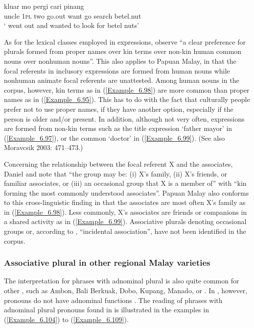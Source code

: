 \ea
\label{Example_6.103}
 {} {} {kluar} {mo} {pergi} {cari} {pinang}\\ %
 uncle  \textsc{1pl}  two  go.out  want  go  search  betel.nut\\

\glt
‘ went out and wanted to look for betel nuts’ \textstyleExampleSource{[081006-009-Cv.0014]}
\z



As for the lexical classes employed in  expressions, \citet[3]{Daniel.2013} observe “a clear preference for  plurals formed from proper names over kin terms over non-kin human common nouns over nonhuman nouns”. This also applies to Papuan Malay, in that the focal referents in  inclusory expressions are formed from human nouns while nonhuman animate focal referents are unattested. Among human nouns in the corpus, however, kin terms as in (\ref{Example_6.98}) are more common than proper names as in (\ref{Example_6.95}). This has to do with the fact that culturally people prefer not to use proper names, if they have another option, especially if the person is older and/or present. In addition, although not very often,  expressions are formed from non-kin terms such as the title  expression  ‘father mayor’ in (\ref{Example_6.97}), or the common   ‘doctor’ in (\ref{Example_6.99}). (See also {Moravcsik 2003: 471–473}.)



Concerning the relationship between the focal referent X and the associates, {Daniel and \citet[3]{Moravcsik.2013}} note that “the group may be: (i) X’s family, (ii) X’s friends, or familiar associates, or (iii) an occasional group that X is a member of” with “kin forming the most commonly understood associates”. Papuan Malay also conforms to this cross-linguistic finding in that the associates are most often X’s family as in (\ref{Example_6.98}). Less commonly, X’s associates are friends or companions in a shared activity as in (\ref{Example_6.99}). Associative plurals denoting occasional groups or, according to {\citet[473]{Moravcsik.2003}}, “incidental association”, have not been identified in the corpus.


\subsubsection[Associative plural in other {regional Malay varieties}]{Associative plural in other regional Malay varieties}
\label{Para_6.2.2.3}
The  interpretation for  phrases with adnominal plural  is also quite common for other , such as Ambon, Bali Berkuak, Dobo, Kupang, Manado, or . In , however, pronouns do not have adnominal functions {\citep[141]{Litamahuputty.2012}}. The  reading of  phrases with adnominal plural pronouns found in  is illustrated in the examples in (\ref{Example_6.104}) to (\ref{Example_6.109}).




